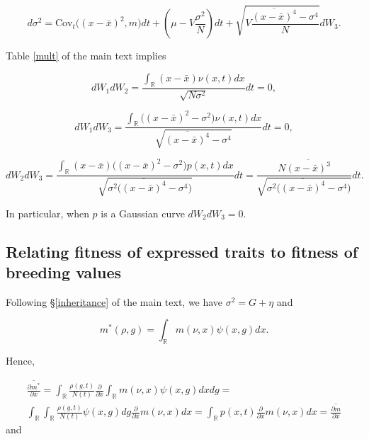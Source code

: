 \documentclass[]{article}
\begin{document}
\begin{equation}
d\sigma^2=\mathrm{Cov}_t\Big((x-\bar x)^2,m\Big)dt+\left(\mu-V\frac{\sigma^2}{N}\right)dt+\sqrt{V\frac{\overline{(x-\bar x)^4}-\sigma^4}{N}}d W_3.
\end{equation}

Table \ref{mult} of the main text implies

\begin{equation}
d W_1d W_2=\frac{\int_\mathbb{R}(x-\bar x)\nu(x,t)dx}{\sqrt{N\sigma^2}}dt=0,
\end{equation}

\begin{equation}
d W_1d W_3=\frac{\int_\mathbb{R}\big((x-\bar x)^2-\sigma^2\big)\nu(x,t)dx}{\sqrt{\overline{(x-\bar x)^4}-\sigma^4}}dt=0,
\end{equation}

\begin{equation}
d W_2d W_3=\frac{\int_\mathbb{R}(x-\bar x)\big((x-\bar x)^2-\sigma^2\big)p(x,t)dx}{\sqrt{\sigma^2\big(\overline{(x-\bar x)^4}-\sigma^4\big)}}dt
=\frac{N\overline{(x-\bar x)^3}}{\sqrt{\sigma^2\big(\overline{(x-\bar x)^4}-\sigma^4\big)}}dt.
\end{equation}

In particular, when \(p\) is a Gaussian curve \(d W_2d W_3=0\).

\hypertarget{relating-fitness-of-expressed-traits-to-fitness-of-breeding-values}{%
\subsection{\texorpdfstring{Relating fitness of expressed traits to
fitness of breeding values
\label{fit2fit}}{Relating fitness of expressed traits to fitness of breeding values }}\label{relating-fitness-of-expressed-traits-to-fitness-of-breeding-values}}

Following \S\ref{inheritance} of the main text, we have
\(\sigma^2=G+\eta\) and

\begin{equation}
m^*(\rho,g)=\int_\mathbb{R}m(\nu,x)\psi(x,g)dx.
\end{equation}

Hence,

\begin{multline}
\overline{\frac{\partial m^*}{\partial\bar x}}=\int_{\mathbb{R}}\frac{\rho(g,t)}{N(t)}\frac{\partial}{\partial\bar x}\int_\mathbb{R}m(\nu,x)\psi(x,g)dxdg= \\
\int_{\mathbb{R}}\int_\mathbb{R}\frac{\rho(g,t)}{N(t)}\psi(x,g)dg\frac{\partial}{\partial\bar x}m(\nu,x)dx=\int_\mathbb{R}p(x,t)\frac{\partial}{\partial\bar x}m(\nu,x)dx=\overline{\frac{\partial m}{\partial\bar x}}
\end{multline} and
\end{document}
